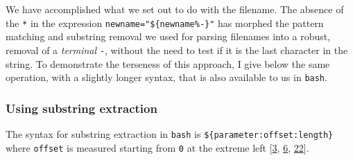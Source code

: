 \documentclass[
  a4paper,
]{article}
\begin{document}
We have accomplished what we set out to do with the filename. The
absence of the \texttt{*} in the expression
\texttt{newname="\$\{newname\%-\}"} has morphed the pattern matching and
substring removal we used for parsing filenames into a robust, removal
of a \emph{terminal} \texttt{-}, without the need to test if it is the
last character in the string. To demonstrate the terseness of this
approach, I give below the same operation, with a slightly longer
syntax, that is also available to us in \texttt{bash}.

\hypertarget{using-substring-extraction}{%
\subsubsection{Using substring
extraction}\label{using-substring-extraction}}

The syntax for substring extraction in \texttt{bash} is
\texttt{\$\{parameter:offset:length\}} where \texttt{offset} is measured
starting from \texttt{0} at the extreme left
{[}\protect\hyperlink{ref-parametersubs}{3},
\protect\hyperlink{ref-stringops}{6},
\protect\hyperlink{ref-substring}{22}{]}.
\end{document}
